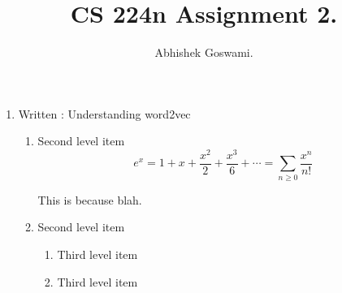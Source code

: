 \documentclass[]{article}
\begin{document}
\title{CS 224n Assignment 2.}
\author{Abhishek Goswami.}
\maketitle

\begin{enumerate}
	\item Written : Understanding word2vec
	
	\begin{enumerate}
	
		\item
			Second level item
			\begin{equation}
				e^x = 1 + x + \frac{x^2}{2} + \frac{x^3}{6} + \cdots = \sum_{n\geq 0} \frac{x^n}{n!}
			\end{equation}
		
			This is because blah.
			
		\item Second level item
		
		\begin{enumerate}
			\item Third level item
      \item Third level item
    \end{enumerate}
  
	\end{enumerate}

\end{enumerate}
\end{document}
